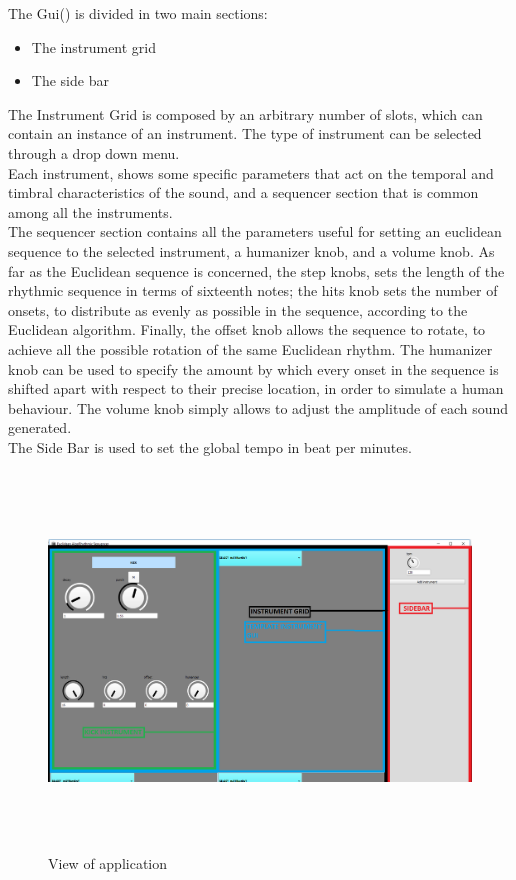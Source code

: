 \documentclass[main.tex]{subfiles}
\begin{document}
The Gui() is divided in two main sections:
\begin{itemize}[noitemsep]
\item The instrument grid
\item The side bar
\end{itemize}
The Instrument Grid is composed by an arbitrary number of slots, which can contain an instance of an instrument. The type of instrument can be selected through a drop down menu.\\
[2mm]
Each instrument, shows some specific parameters that act on the temporal and timbral characteristics of the sound, and a sequencer section that is common among all the instruments.\\
[2mm]
The sequencer section contains all the parameters useful for setting an euclidean sequence to the selected instrument, a humanizer knob, and a volume knob. 
As far as the Euclidean sequence is concerned, the step knobs, sets the length of the rhythmic sequence in terms of sixteenth notes; the hits knob sets the number of onsets, to distribute as evenly as possible in the sequence, according to the Euclidean algorithm. Finally, the offset knob allows the sequence to rotate, to achieve all the possible rotation of the same Euclidean rhythm.
The humanizer knob can be used to specify the amount by which every onset in the sequence is shifted apart with respect to their precise location, in order to simulate a human behaviour.
The volume knob simply allows to adjust the amplitude of each sound generated.\\
[2mm]
The Side Bar is used to set the global tempo in beat per minutes.\\
[2mm]
\begin{figure}[htbp]
\centering
\includegraphics[height=10cm, width=15cm, keepaspectratio]{images/gui.png}
\caption{View of application}
\label{fig:gui}
\end{figure}\\
\end{document}
